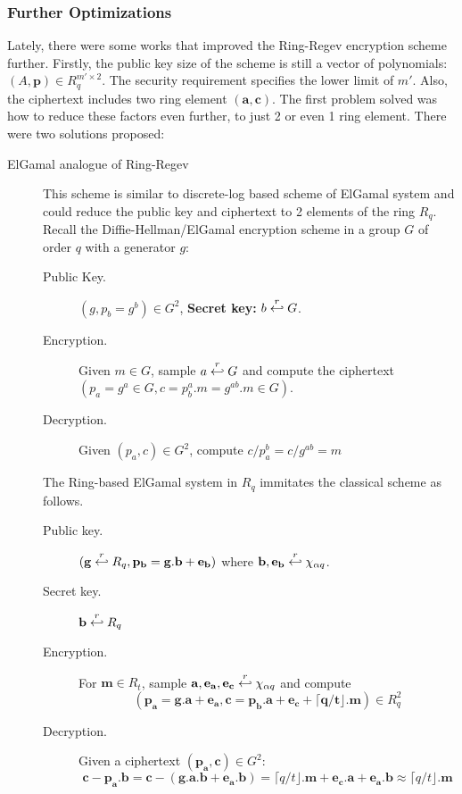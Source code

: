 \subsubsection{Further Optimizations}
\label{sec:furtherOptimizations}
Lately, there were some works that improved the Ring-Regev encryption scheme
further. Firstly, the public key size of the scheme is still a vector of
polynomials: $(A,\mathbf{p}) \in R_{q}^{m' \times 2}$. The security requirement
specifies the lower limit of $m'$. Also, the ciphertext includes two ring
element $(\mathbf{a,c})$. The first problem solved was how to reduce these
factors even further, to just 2 or even 1 ring element. There were two solutions
proposed:
\begin{description}
\item[ElGamal analogue of Ring-Regev \cite{lyubashevsky2010ideal}] This scheme
  is similar to discrete-log based scheme of ElGamal system and could reduce the
  public key and ciphertext to 2 elements of the ring $R_q$. Recall the
  Diffie-Hellman/ElGamal encryption scheme in a group $G$ of order $q$ with a
  generator $g$:
  \begin{description}
  \item[Public Key.] $(g, p_b = g^b) \in G^2$, \textbf{Secret key:}
    $b \stackrel{r}{\hookleftarrow} G$.
  \item [Encryption.] Given $m \in G$, sample $a \stackrel{r}{\hookleftarrow} G$ and compute
    the ciphertext $(p_a = g^a \in G, c = p_b^a.m = g^{ab}.m \in G)$.
  \item [Decryption.] Given $(p_a, c) \in G^2$, compute $c/p_a^b = c/g^{ab} = m$
  \end{description}
  The Ring-based ElGamal system in $R_q$ immitates the classical scheme as
  follows.
  \begin{description}
  \item[Public key.] $(\mathbf{g} \stackrel{r}{\hookleftarrow} R_q, \mathbf{p_b = g.b + e_b})$
    where $\mathbf{b,e_b} \stackrel{r}{\hookleftarrow} \chi_{\alpha q}$.
  \item [Secret key.] $\mathbf{b} \stackrel{r}{\hookleftarrow} R_q$
  \item [Encryption.] For $\mathbf{m} \in R_t$, sample
    $\mathbf{a,e_a,e_c} \stackrel{r}{\hookleftarrow} \chi_{\alpha q}$ and
    compute
    $$(\mathbf{p_a = g.a + e_a}, \mathbf{c = p_b.a + e_c + \lceil q/t \rfloor
      . m}) \in R_q^2$$
  \item [Decryption.] Given a ciphertext $(\mathbf{p_a,c}) \in G^2$:
    \[
      \mathbf{c - p_a.b = c - (g.a.b + e_a.b)} = \lceil q/t \rfloor .\mathbf{m}
      + \mathbf{e_c.a} + \mathbf{e_a.b} \approx \lceil q/t \rfloor.\mathbf{m}
\]
\end{description}
\end{description}
